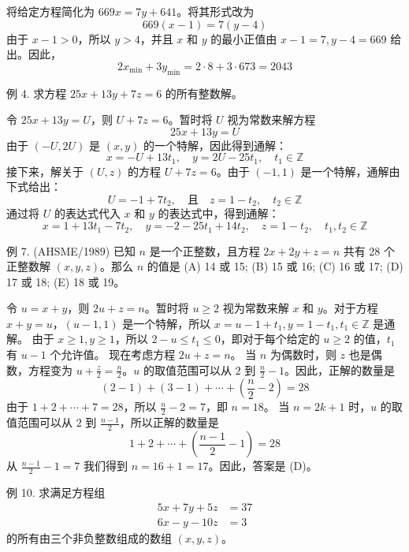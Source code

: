 \begin{questions}
\begin{solution}
将给定方程简化为 $669x = 7y + 641$。将其形式改为
\[
669(x - 1) = 7(y - 4)
\]
由于 $x - 1 > 0$，所以 $y > 4$，并且 $x$ 和 $y$ 的最小正值由 $x - 1 = 7, y - 4 = 669$ 给出。因此，
\[
2x_{\min} + 3y_{\min} = 2 \cdot 8 + 3 \cdot 673 = 2043
\]
\end{solution}

\question 例 4. 求方程 $25x + 13y + 7z = 6$ 的所有整数解。

\begin{solution}
令 $25x + 13y = U$，则 $U + 7z = 6$。暂时将 $U$ 视为常数来解方程
\[
25x + 13y = U
\]
由于 $(-U, 2U)$ 是 $(x, y)$ 的一个特解，因此得到通解：
\[
x = -U + 13t_1, \quad y = 2U - 25t_1, \quad t_1 \in \mathbb{Z}
\]
接下来，解关于 $(U, z)$ 的方程 $U + 7z = 6$。由于 $(-1, 1)$ 是一个特解，通解由下式给出：
\[
U = -1 + 7t_2, \quad \text{且} \quad z = 1 - t_2, \quad t_2 \in \mathbb{Z}
\]
通过将 $U$ 的表达式代入 $x$ 和 $y$ 的表达式中，得到通解：
\[
x = 1 + 13t_1 - 7t_2, \quad y = -2 - 25t_1 + 14t_2, \quad z = 1 - t_2, \quad t_1, t_2 \in \mathbb{Z}
\]
\end{solution}

\question 例 7. (AHSME/1989) 已知 $n$ 是一个正整数，且方程 $2x + 2y + z = n$ 共有 28 个正整数解 $(x, y, z)$。那么 $n$ 的值是
(A) 14 或 15; (B) 15 或 16; (C) 16 或 17; (D) 17 或 18; (E) 18 或 19。

\begin{solution}
令 $u = x + y$，则 $2u + z = n$。暂时将 $u \ge 2$ 视为常数来解 $x$ 和 $y$。对于方程 $x + y = u$，$(u - 1, 1)$ 是一个特解，所以 $x = u - 1 + t_1, y = 1 - t_1, t_1 \in \mathbb{Z}$ 是通解。
由于 $x \ge 1, y \ge 1$，所以 $2 - u \le t_1 \le 0$，即对于每个给定的 $u \ge 2$ 的值，$t_1$ 有 $u - 1$ 个允许值。
现在考虑方程 $2u + z = n$。
当 $n$ 为偶数时，则 $z$ 也是偶数，方程变为 $u + \frac{z}{2} = \frac{n}{2}$。$u$ 的取值范围可以从 $2$ 到 $\frac{n}{2} - 1$。因此，正解的数量是
\[
(2 - 1) + (3 - 1) + \cdots + \left( \frac{n}{2} - 2 \right) = 28
\]
由于 $1 + 2 + \cdots + 7 = 28$，所以 $\frac{n}{2} - 2 = 7$，即 $n = 18$。
当 $n = 2k + 1$ 时，$u$ 的取值范围可以从 $2$ 到 $\frac{n - 1}{2}$，所以正解的数量是
\[
1 + 2 + \cdots + \left( \frac{n - 1}{2} - 1 \right) = 28
\]
从 $\frac{n - 1}{2} - 1 = 7$ 我们得到 $n = 16 + 1 = 17$。因此，答案是 (D)。
\end{solution}

\question 例 10. 求满足方程组
\begin{align*}
5x + 7y + 5z &= 37 \\
6x - y - 10z &= 3
\end{align*}
的所有由三个非负整数组成的数组 $(x, y, z)$。


\end{questions}
